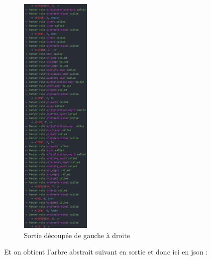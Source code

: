 \documentclass[french,a4paper]{article}
\begin{document}
\begin{figure}[H]
        \hfill
        \includegraphics[width=0.3\textwidth]{sortie3}
        \caption{Sortie découpée de gauche à droite}\label{fig:figure4}
    \end{figure}

    Et on obtient l'arbre abstrait suivant en sortie et donc ici en json :
\end{document}
